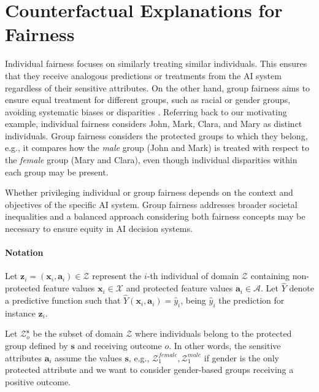\documentclass[letterpaper]{article} %
\begin{document}
\section{Counterfactual Explanations for Fairness}

Individual fairness focuses on similarly treating similar individuals. This ensures that they receive analogous predictions or treatments from the AI system regardless of their sensitive attributes. On the other hand, group fairness aims to ensure equal treatment for different groups, such as racial or gender groups, avoiding systematic biases or disparities \cite{ChakrabortyPM20,10.1145/2090236.2090255}.
%
Referring back to our motivating example, individual fairness considers John, Mark, Clara, and Mary as distinct individuals. Group fairness considers the protected groups to which they belong, e.g., it compares how the \emph{male} group (John and Mark) is treated with respect to the \emph{female} group (Mary and Clara), even though individual disparities within each group may be present.

Whether privileging individual or group fairness depends on the context and objectives of the specific AI system. Group fairness addresses broader societal inequalities and a balanced approach considering both fairness concepts may be necessary to ensure equity in AI decision systems.

\paragraph{Notation}
% 
Let $\boldsymbol{z}_i = (\boldsymbol{x}_i, \boldsymbol{a}_i) \in \mathcal{Z}$ represent the $i$-th individual of domain $\mathcal{Z}$ containing non-protected feature values $\boldsymbol{x}_i \in \mathcal{X}$ and protected feature values $\boldsymbol{a}_i \in \mathcal{A}$.
%
Let $\hat{Y}$ denote a predictive function such that $\hat{Y}(\boldsymbol{x}_i, \boldsymbol{a}_i) = \hat{y}_i$, being $\hat{y}_i$ the prediction for instance $\boldsymbol{z}_i$.

Let $\mathcal{Z}^{\boldsymbol{s}}_o$ be the subset of domain $\mathcal{Z}$ where individuals belong to the protected group defined by $\boldsymbol{s}$ and receiving outcome $o$. In other words, the sensitive attributes $\boldsymbol{a}_i$ assume the values $\boldsymbol{s}$, e.g., $\mathcal{Z}^{female}_1, \mathcal{Z}^{male}_1$ if gender is the only protected attribute and we want to consider gender-based groups receiving a positive outcome.
%
\end{document}
